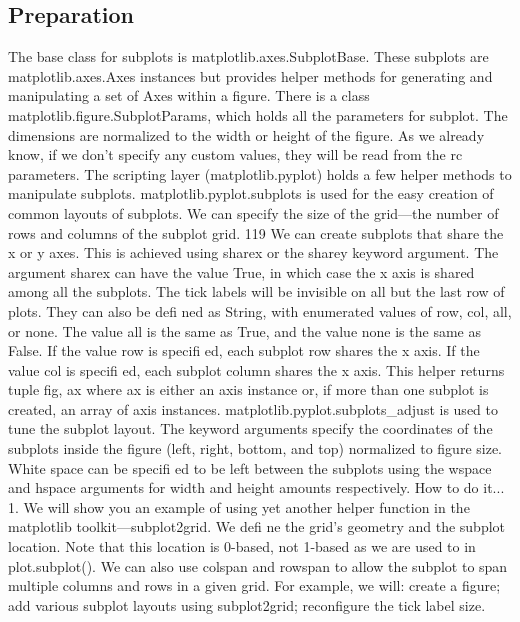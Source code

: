\subsection{Preparation}
The base class for subplots is matplotlib.axes.SubplotBase. These subplots are
matplotlib.axes.Axes instances but provides helper methods for generating and
manipulating a set of Axes within a figure.
There is a class matplotlib.figure.SubplotParams, which holds all the parameters for
subplot. The dimensions are normalized to the width or height of the figure. As we already
know, if we don't specify any custom values, they will be read from the rc parameters.
The scripting layer (matplotlib.pyplot) holds a few helper methods to
manipulate subplots.
matplotlib.pyplot.subplots is used for the easy creation of common layouts of
subplots. We can specify the size of the grid—the number of rows and columns of the
subplot grid.
\newpage %
119
We can create subplots that share the x or y axes. This is achieved using sharex or the
sharey keyword argument. The argument sharex can have the value True, in which case
the x axis is shared among all the subplots. The tick labels will be invisible on all but the last
row of plots. They can also be defi ned as String, with enumerated values of row, col, all, or
none. The value all is the same as True, and the value none is the same as False. If the
value row is specifi ed, each subplot row shares the x axis. If the value col is specifi ed, each
subplot column shares the x axis. This helper returns tuple fig, ax where ax is either an
axis instance or, if more than one subplot is created, an array of axis instances.
matplotlib.pyplot.subplots_adjust is used to tune the subplot layout. The
keyword arguments specify the coordinates of the subplots inside the figure (left, right,
bottom, and top) normalized to figure size. White space can be specifi ed to be left
between the subplots using the wspace and hspace arguments for width and height
amounts respectively.
How to do it...
1. We will show you an example of using yet another helper function in the matplotlib
toolkit—subplot2grid. We defi ne the grid's geometry and the subplot location. Note
that this location is 0-based, not 1-based as we are used to in plot.subplot(). We
can also use colspan and rowspan to allow the subplot to span multiple columns
and rows in a given grid. For example, we will: create a figure; add various subplot
layouts using subplot2grid; reconfigure the tick label size.
